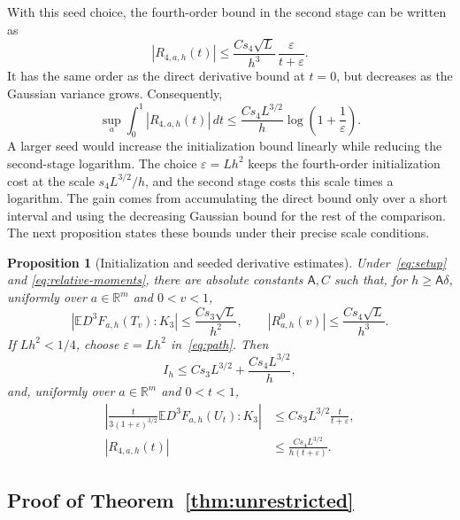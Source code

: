 \documentclass[11pt,letterpaper]{article}
\newtheorem{proposition}{Proposition}
\theoremstyle{remark}
\newcommand{\E}{\mathbb E}
\newcommand{\R}{\mathbb R}
\begin{document}
{{With this seed choice, the fourth-order bound in the second stage
can be written as
\[
 |R_{4,a,h}(t)|
 \le \frac{Cs_4\sqrt L}{h^3}\,
       \frac{\varepsilon}{t+\varepsilon}.
\]
It has the same order as the direct derivative bound at \(t=0\),
but decreases as the Gaussian variance grows. Consequently,
\[
 \sup_a\int_0^1|R_{4,a,h}(t)|\,dt
 \le \frac{Cs_4L^{3/2}}h
       \log\!\left(1+\frac1\varepsilon\right).
\]
A larger seed would increase the initialization bound linearly while
reducing the second-stage logarithm. The choice \(\varepsilon=Lh^2\)
keeps the fourth-order initialization cost at the scale
\(s_4L^{3/2}/h\), and the second stage costs this scale times a
logarithm. The gain comes from accumulating the direct bound only
over a short interval and using the decreasing Gaussian bound for
the rest of the comparison.
The next proposition states these bounds under their precise
scale conditions.
}

}

\begin{proposition}[Initialization and seeded derivative estimates]
\label{an:prop:derivative}
Under~\eqref{eq:setup} and \eqref{eq:relative-moments}, there are absolute constants \(\mathsf A,C\)
such that, for \(h\ge\mathsf A\delta\), uniformly over
\(a\in\R^m\) and \(0<v<1\),
\begin{equation}
 |\E D^3F_{a,h}(T_v):K_3|\le\frac{Cs_3\sqrt L}{h^2},
 \qquad |R^0_{a,h}(v)|\le\frac{Cs_4\sqrt L}{h^3}.
 \label{eq:direct-initialization}
\end{equation}
If \(Lh^2<1/4\), choose \(\varepsilon=Lh^2\) in~\eqref{eq:path}.
Then
\begin{equation}
 I_h\le Cs_3 L^{3/2}+\frac{Cs_4L^{3/2}}h,
 \label{eq:initialization-bound}
\end{equation}
and, uniformly over \(a\in\R^m\) and \(0<t<1\),
\begin{equation}
 \begin{aligned}
 \left|\frac{t}{3(1+\varepsilon)^{3/2}}
          \E D^3F_{a,h}(U_t):K_3\right|
 &\le Cs_3 L^{3/2}\frac{t}{t+\varepsilon},\\
 |R_{4,a,h}(t)|&\le\frac{Cs_4L^{3/2}}{h(t+\varepsilon)}.
 \end{aligned}
 \label{eq:seeded-derivatives}
\end{equation}

\end{proposition}
\subsection{Proof of Theorem~\ref*{thm:unrestricted}}\label{sec:proof-theorem-one}
\end{document}
